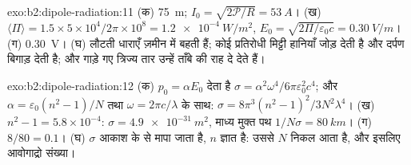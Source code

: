 \begin{solution}{exo:b2:dipole-radiation:11}
(क) \qty{75}{m}; $I_0 = \sqrt{2\mathcal P/R} = \qty{53}{A}$। (ख) $\langle\Pi\rangle = 1.5 \times
5 \times 10^4/2\pi \times 10^8 = \qty{1.2e-4}{W/m^2}$, $E_0 = \sqrt{2\Pi/\varepsilon_0c} = \qty{0.30}{V/m}$।
(ग) \qty{0.30}{V}। (घ) लौटती धाराएँ ज़मीन में बहती हैं; कोई प्रतिरोधी
मिट्टी हानियाँ जोड़ देती है और दर्पण बिगाड़ देती है; और गाड़े गए त्रिज्य तार
उन्हें ताँबे की राह दे देते हैं।
\end{solution}

\begin{solution}{exo:b2:dipole-radiation:12}
(क) $p_0 = \alpha E_0$ देता है $\sigma = \alpha^2\omega^4/6\pi\varepsilon_0^2c^4$; और $\alpha = \varepsilon_0(n^2
- 1)/N$ तथा $\omega = 2\pi c/\lambda$ के साथ: $\sigma = 8\pi^3(n^2 - 1)^2/3N^2\lambda^4$। (ख) $n^2 - 1 =
5.8 \times 10^{-4}$: $\sigma = \qty{4.9e-31}{m^2}$, माध्य मुक्त पथ $1/N\sigma = \qty{80}{km}$। (ग)
$8/80 = 0.1$। (घ) $\sigma$ आकाश के  से मापा जाता है, $n$ ज्ञात
है: उससे $N$ निकल आता है, और इसलिए आवोगाद्रो संख्या।
\end{solution}

